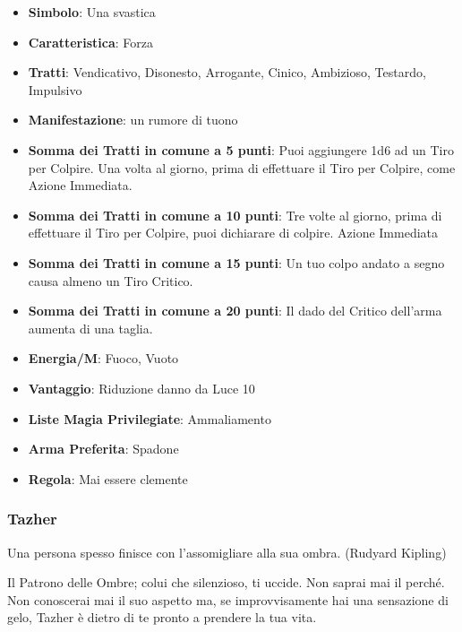 \begin{multicols}{2}
\begin{itemize}[leftmargin=*] \setlength{\itemsep}{0pt}
\item \textbf{Simbolo}: Una svastica
\item \textbf{Caratteristica}: Forza
\item \textbf{Tratti}: Vendicativo, Disonesto, Arrogante, Cinico, Ambizioso, Testardo, Impulsivo
\item \textbf{Manifestazione}: un rumore di tuono
\item \textbf{Somma dei Tratti in comune a 5 punti}: Puoi aggiungere 1d6 ad un Tiro per Colpire. Una volta al giorno, prima di effettuare il Tiro per Colpire, come Azione Immediata.
\item \textbf{Somma dei Tratti in comune a 10 punti}: Tre volte al giorno, prima di effettuare il Tiro per Colpire, puoi dichiarare di colpire. Azione Immediata
\item \textbf{Somma dei Tratti in comune a 15 punti}: Un tuo colpo andato a segno causa almeno un Tiro Critico.
\item \textbf{Somma dei Tratti in comune a 20 punti}: Il dado del Critico dell'arma aumenta di una taglia.
\item \textbf{Energia/M}: Fuoco, Vuoto
\item \textbf{Vantaggio}: Riduzione danno da Luce 10
\item \textbf{Liste Magia Privilegiate}: Ammaliamento
\item \textbf{Arma Preferita}: Spadone
\item \textbf{Regola}: Mai essere clemente
\end{itemize}


\subsubsection{Tazher}\label{tazher}\hypertarget{tazher}{}

\begin{changemargin}{0.3cm}{0.3cm}\begin{enfasi}{
Una persona spesso finisce con l'assomigliare alla sua ombra. (Rudyard Kipling)
}\end{enfasi}\end{changemargin}

Il Patrono delle Ombre; colui che silenzioso, ti uccide. Non saprai mai il perché. Non conoscerai mai il suo aspetto ma, se improvvisamente hai una sensazione di gelo, Tazher è dietro di te pronto a prendere la tua vita.


\end{multicols}
